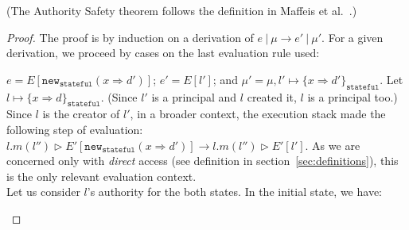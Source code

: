 \documentclass{llncs}
\newcommand{\keywadj}[1]{\mathtt{#1}}
\newcommand{\pcase}[1][]{
  \if\relax\detokenize{#1}\relax
    \def\thiscase{}
  \else
    \def\thiscase{~#1}
  \fi
  \item
}
\begin{document}
(The Authority Safety theorem follows the definition in Maffeis et al.~\cite{Maffeis:2010}.)

\begin{proof} The proof is by induction on a derivation of $e~|~\mu \longrightarrow e'~|~\mu'$. For a given derivation, we proceed by cases on the last evaluation rule used:

\sloppy 

\begin{pcases}
\pcase[\textsc{E-New}]
$e = E[\keywadj{new}_{\keywadj{stateful}}(x \Rightarrow d')]$; $e' = E[l']$; and $\mu' = \mu, l' \mapsto \{ x \Rightarrow d' \}_{\keywadj{stateful}}$. Let $l \mapsto \{ x \Rightarrow d \}_{\keywadj{stateful}}$. (Since $l'$ is a principal and $l$ created it, $l$ is a principal too.) Since $l$ is the creator of $l'$, in a broader context, the execution stack made the following step of evaluation: \mbox{$l.m(l'') \rhd E'[\keywadj{new}_{\keywadj{stateful}}(x \Rightarrow d')] \longrightarrow l.m(l'') \rhd E'[l']$}. As we are concerned only with \emph{direct} access (see definition in section~\ref{sec:definitions}), this is the only relevant evaluation context.\\

Let us consider $l$'s authority for the both states. In the initial state, we have:\\


\end{pcases}
\end{proof}
\end{document}
